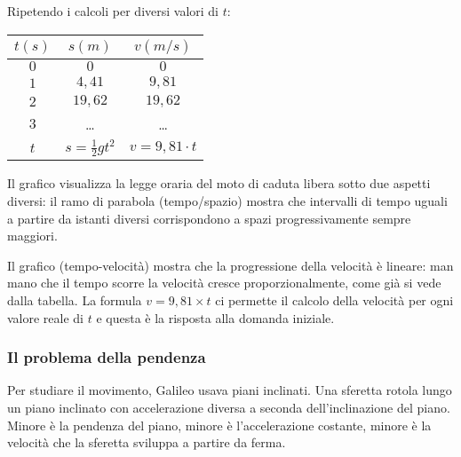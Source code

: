 \noindent \begin{minipage}{0.35\textwidth}
Ripetendo i calcoli per diversi valori di \(t\):
 \begin{center}
\begin{tabular}{ccc}\toprule
\(t (s)\)      & \(s (m)\) & \(v(m/s)\)  \\\midrule
\(0\)      & \(0\)                 & \(0\)  \\
\(1\)      & \(4,41\)              & \(9,81\) \\
\(2\)      & \(19,62\)             & \(19,62\) \\
\(3\)      & \dots                 & \dots \\
\(t\)      & \(s=\frac{1}{2}gt^2\) & \(v=9,81 \cdot t\) \\\bottomrule
\end{tabular}
\label{tab:diff_velocita}
\end{center}
 \end{minipage}
  \hfill
 \begin{minipage}{.63 \textwidth}
 \end{minipage}

Il grafico visualizza la legge oraria del 
moto di caduta libera sotto due aspetti diversi: il ramo di parabola 
(tempo/spazio) mostra che intervalli di tempo uguali a partire da istanti 
diversi corrispondono a spazi progressivamente sempre maggiori. 

Il grafico (tempo-velocità) mostra che la progressione della velocità 
è lineare: man mano che il tempo scorre la velocità cresce 
proporzionalmente, come già si vede dalla tabella.
La formula \(v=9,81\times t\) ci permette il calcolo della velocità per 
ogni valore reale di \(t\) e questa è la risposta alla domanda iniziale. 

\subsubsection{Il problema della pendenza}
\label{subsec:differenziazione_pendenza}
Per studiare il movimento, Galileo usava piani inclinati. 
Una sferetta rotola lungo un piano inclinato con accelerazione diversa a 
seconda dell'inclinazione del piano. 
Minore è la pendenza del piano, minore è l'accelerazione costante, 
minore è la velocità che la sferetta sviluppa a partire da ferma. 


